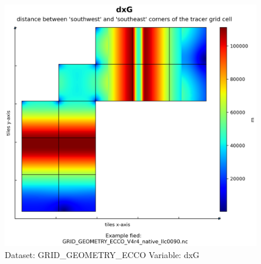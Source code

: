 \begin{figure}[H]
\centering
\includegraphics[scale=0.55]{../images/plots/native_plots_coords/Geometry_Parameters_for_the_Lat-Lon-Cap_90_(llc90)_Native_Model_Grid_(Version_4_Release_4)/dxG.png}
\caption{Dataset: GRID\_GEOMETRY\_ECCO Variable: dxG}
\label{tab:table-GRID_GEOMETRY_ECCO_dxG-Plot}
\end{figure}
\pagebreak
